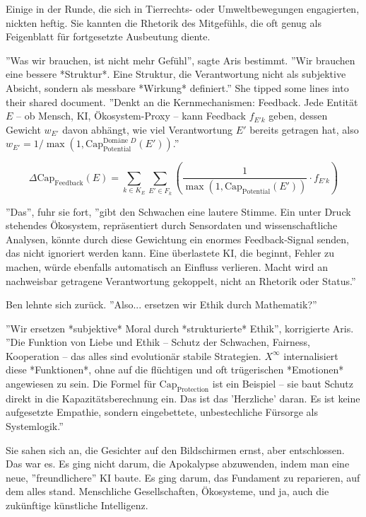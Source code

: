 \documentclass[12pt, ngerman, parskip=full]{scrartcl} %
\begin{document}
Einige in der Runde, die sich in Tierrechts- oder Umweltbewegungen engagierten, nickten heftig. Sie kannten die Rhetorik des Mitgefühls, die oft genug als Feigenblatt für fortgesetzte Ausbeutung diente.

''Was wir brauchen, ist nicht mehr Gefühl'', sagte Aris bestimmt. ''Wir brauchen eine bessere *Struktur*. Eine Struktur, die Verantwortung nicht als subjektive Absicht, sondern als messbare *Wirkung* definiert.'' She tipped some lines into their shared document. ''Denkt an die Kernmechanismen: Feedback. Jede Entität $E$ – ob Mensch, KI, Ökosystem-Proxy – kann Feedback $f_{E'k}$ geben, dessen Gewicht $w_{E'}$ davon abhängt, wie viel Verantwortung $E'$ bereits getragen hat, also $w_{E'} = 1/\max(1, \text{Cap}_{\text{Potential}}^{\text{Domäne } D}(E'))$.''

$$ \Delta \text{Cap}_{\text{Feedback}}(E) = \sum_{k \in K_E} \sum_{E' \in F_k} \left( \frac{1}{\max(1, \text{Cap}_{\text{Potential}}(E'))} \cdot f_{E'k} \right) $$

''Das'', fuhr sie fort, ''gibt den Schwachen eine lautere Stimme. Ein unter Druck stehendes Ökosystem, repräsentiert durch Sensordaten und wissenschaftliche Analysen, könnte durch diese Gewichtung ein enormes Feedback-Signal senden, das nicht ignoriert werden kann. Eine überlastete KI, die beginnt, Fehler zu machen, würde ebenfalls automatisch an Einfluss verlieren. Macht wird an nachweisbar getragene Verantwortung gekoppelt, nicht an Rhetorik oder Status.''

Ben lehnte sich zurück. ''Also... ersetzen wir Ethik durch Mathematik?''

''Wir ersetzen *subjektive* Moral durch *strukturierte* Ethik'', korrigierte Aris. ''Die Funktion von Liebe und Ethik – Schutz der Schwachen, Fairness, Kooperation – das alles sind evolutionär stabile Strategien. $X^{\infty}$ internalisiert diese *Funktionen*, ohne auf die flüchtigen und oft trügerischen *Emotionen* angewiesen zu sein. Die Formel für $\text{Cap}_{\text{Protection}}$ ist ein Beispiel – sie baut Schutz direkt in die Kapazitätsberechnung ein. Das ist das 'Herzliche' daran. Es ist keine aufgesetzte Empathie, sondern eingebettete, unbestechliche Fürsorge als Systemlogik.''

Sie sahen sich an, die Gesichter auf den Bildschirmen ernst, aber entschlossen. Das war es. Es ging nicht darum, die Apokalypse abzuwenden, indem man eine neue, ''freundlichere'' KI baute. Es ging darum, das Fundament zu reparieren, auf dem alles stand. Menschliche Gesellschaften, Ökosysteme, und ja, auch die zukünftige künstliche Intelligenz.
\end{document}
